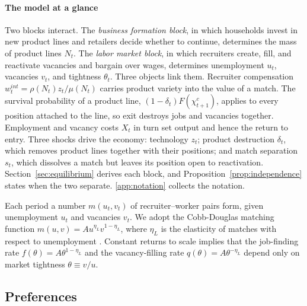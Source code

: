 \documentclass[authoryear, review, 12pt]{elsarticle}
\begin{document}
	\paragraph{The model at a glance}
	Two blocks interact. The \emph{business formation block}, in which households invest in new
	product lines and retailers decide whether to continue, determines the mass of product
	lines $N_t$. The \emph{labor market block}, in which recruiters create, fill, and reactivate
	vacancies and bargain over wages, determines unemployment $u_t$, vacancies $v_t$, and
	tightness $\theta_t$. Three objects link them. Recruiter compensation
	$w_t^{int}=\rho(N_t)z_t/\mu(N_t)$ carries product variety into the value of a match. The
	survival probability of a product line, $(1-\delta_t)F(\chi_{t+1}^c)$, applies to every
	position attached to the line, so exit destroys jobs and vacancies together. Employment
	and vacancy costs $X_t$ in turn set output and hence the return to entry. Three shocks
	drive the economy: technology $z_t$; product destruction $\delta_t$, which removes product
	lines together with their positions; and match separation $s_t$, which dissolves a match
	but leaves its position open to reactivation. Section~\ref{sec:equilibrium} derives each block,
	and Proposition~\ref{prop:independence} states when the two separate. \ref{app:notation}
	collects the notation.
	
	Each period a number $m(u_t,v_t)$ of recruiter--worker pairs form, 
	given unemployment $u_t$ and vacancies $v_t$. We adopt the 
	Cobb-Douglas matching function $m(u,v)=Au^{\eta_L}v^{1-\eta_L}$, 
	where $\eta_L$ is the elasticity of matches with respect to 
	unemployment \citep{petrongolo_2001}. Constant returns to scale 
	implies that the job-finding rate $f(\theta)=A\theta^{1-\eta_L}$ 
	and the vacancy-filling rate $q(\theta)=A\theta^{-\eta_L}$ depend 
	only on market tightness $\theta\equiv v/u$.
	\subsection{Preferences}
	
\end{document}
